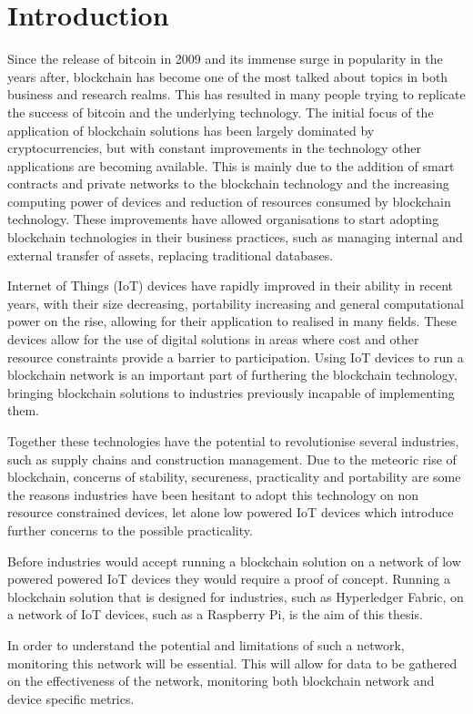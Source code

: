 \chapter{Introduction}\label{ch:intro}

Since the release of bitcoin in 2009 and its immense surge in popularity in the years after, blockchain has become one of the most talked about topics in both business and research realms. This has resulted in many people trying to replicate the success of bitcoin and the underlying technology. The initial focus of the application of blockchain solutions has been largely dominated by cryptocurrencies, but with constant improvements in the technology other applications are becoming available. This is mainly due to the addition of smart contracts and private networks to the blockchain technology and the increasing computing power of devices and reduction of resources consumed by blockchain technology. These improvements have allowed organisations to start adopting blockchain technologies in their business practices, such as managing internal and external transfer of assets, replacing traditional databases.

Internet of Things (IoT) devices have rapidly improved in their ability in recent years, with their size decreasing, portability increasing and general computational power on the rise, allowing for their application to realised in many fields. These devices allow for the use of digital solutions in areas where cost and other resource constraints provide a barrier to participation. Using IoT devices to run a blockchain network is an important part of furthering the blockchain technology, bringing blockchain solutions to industries previously incapable of implementing them.

Together these technologies have the potential to revolutionise several industries, such as supply chains and construction management. Due to the meteoric rise of blockchain, concerns of stability, secureness, practicality and portability are some the reasons industries have been hesitant to adopt this technology on non resource constrained devices, let alone low powered IoT devices which introduce further concerns to the possible practicality.

Before industries would accept running a blockchain solution on a network of low powered powered IoT devices they would require a proof of concept. Running a blockchain solution that is designed for industries, such as Hyperledger Fabric, on a network of IoT devices, such as a Raspberry Pi, is the aim of this thesis.

In order to understand the potential and limitations of such a network, monitoring this network will be essential. This will allow for data to be gathered on the effectiveness of the network, monitoring both blockchain network and device specific metrics.
